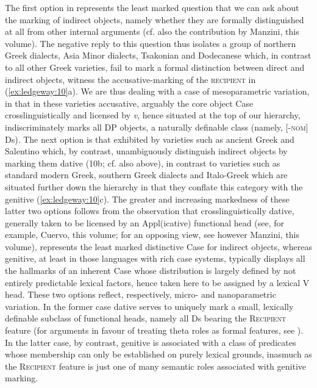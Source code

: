 \documentclass[output=paper,modfonts,nonflat,colorlinks,citecolor=brown]{langsci/langscibook}
\begin{document}
The first option in  represents the least marked question that we can ask about the marking of indirect objects, namely whether they are formally distinguished at all from other internal arguments (cf. also the contribution by Manzini, this volume). The negative reply to this question thus isolates a group of northern Greek dialects, Asia Minor dialects, Tsakonian and Dodecanese which, in contrast to all other Greek varieties, fail to mark a formal distinction between direct and indirect objects, witness the accusative-marking of the \textsc{recipient} in (\ref{ex:ledgeway:10}a). We are thus dealing with a case of mesoparametric variation, in that in these varieties accusative, arguably the core object Case crosslinguistically and licensed by \textit{v}, hence situated at the top of our hierarchy, indiscriminately marks all DP objects, a naturally definable class (namely, [-\textsc{nom}] Ds). The next option is that exhibited by varieties such as ancient Greek and Salentino which, by contrast, unambiguously distinguish indirect objects by marking them dative (10b; cf. also  above), in contrast to varieties such as standard modern Greek, southern Greek dialects and Italo-Greek which are situated further down the hierarchy in that they conflate this category with the genitive (\ref{ex:ledgeway:10}c). The greater and increasing markedness of these latter two options follows from the observation that crosslinguistically dative, generally taken to be licensed by an Appl(icative) functional head (see, for example, Cuervo, this volume; for an opposing view, see however Manzini, this volume), represents the least marked distinctive Case for indirect objects, whereas genitive, at least in those languages with rich case systems, typically displays all the hallmarks of an inherent Case whose distribution is largely defined by not entirely predictable lexical factors, hence taken here to be assigned by a lexical V head. These two options reflect, respectively, micro- and nanoparametric variation. In the former case dative serves to uniquely mark a small, lexically definable subclass of functional heads, namely all Ds bearing the \textsc{Recipient} feature (for arguments in favour of treating theta roles as formal features, see \citealt{Hornstein1999}). In the latter case, by contrast, genitive is associated with a class of predicates whose membership can only be established on purely lexical grounds, inasmuch as the \textsc{Recipient} feature is just one of many semantic roles associated with genitive marking. 
\end{document}
